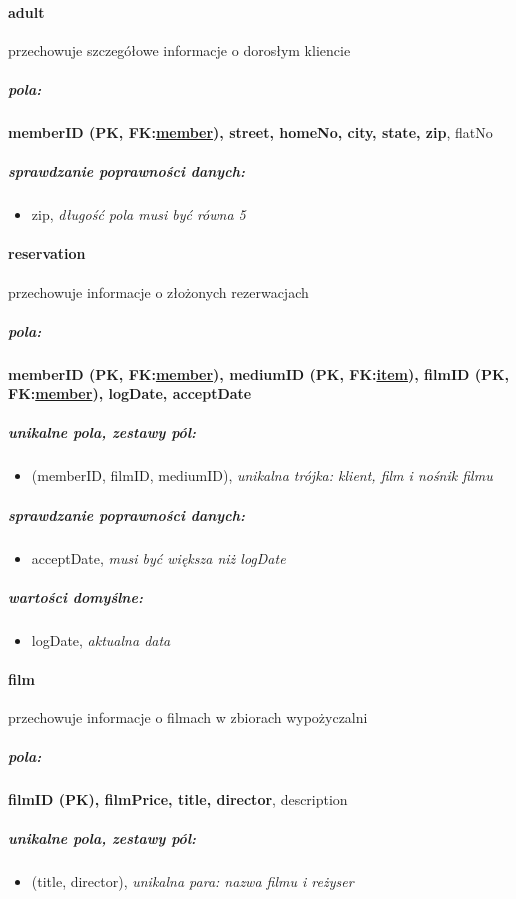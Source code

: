 \documentclass[12pt,a4paper,titlepage]{article}
\begin{document}
\paragraph{adult} przechowuje szczegółowe informacje o dorosłym kliencie
\subparagraph{pola:}
\textbf{memberID (PK, FK:\underline{member}), street, homeNo, city, state, zip}, flatNo
\subparagraph{sprawdzanie poprawności danych:}
\begin{itemize}
	\item zip, \textit{długość pola musi być równa 5}
\end{itemize}

\paragraph{reservation} przechowuje informacje o złożonych rezerwacjach
\subparagraph{pola:}
\textbf{memberID (PK, FK:\underline{member}), mediumID (PK, FK:\underline{item}), filmID (PK, FK:\underline{member}), logDate, acceptDate}
\subparagraph{unikalne pola, zestawy pól:}
\begin{itemize}
	\item (memberID, filmID, mediumID), \textit{unikalna trójka: klient, film i nośnik filmu}
\end{itemize}
\subparagraph{sprawdzanie poprawności danych:}
\begin{itemize}
	\item acceptDate, \textit{musi być większa niż logDate}
\end{itemize}
\subparagraph{wartości domyślne:}
\begin{itemize}
	\item logDate, \textit{aktualna data}
\end{itemize}

\newpage

\paragraph{film} przechowuje informacje o filmach w zbiorach wypożyczalni
\subparagraph{pola:}
\textbf{filmID (PK), filmPrice, title, director}, description
\subparagraph{unikalne pola, zestawy pól:}
\begin{itemize}
	\item (title, director), \textit{unikalna para: nazwa filmu i reżyser}
\end{itemize}

\end{document}
